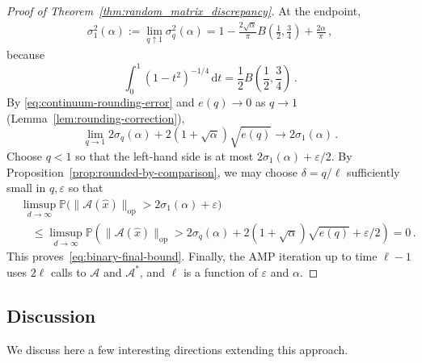 \documentclass[11pt]{article}
\theoremstyle{definition}
\theoremstyle{remark}
\numberwithin{equation}{section}
\numberwithin{theorem}{section}
\newcommand{\Prob}{\mathbb P}
\newcommand{\op}{\mathrm{op}}
\newcommand{\cA}{\mathcal A}
\newcommand{\eps}{\varepsilon}
\newcommand{\rmd}{\mathrm{d}}
\begin{document}
\begin{proof}[Proof of Theorem~\ref{thm:random_matrix_discrepancy}]
At the endpoint,
\begin{align}
 \sigma_1^2(\alpha)
 :=
 \lim_{q\uparrow1}\sigma_q^2(\alpha)
 =
 1-\frac{2\sqrt\alpha}{\pi}
 B\left(\frac12,\frac34\right)
 +\frac{2\alpha}{\pi}\,,
 \label{eq:sigma-one-endpoint-rounding}
\end{align}
because
\[
 \int_0^1(1-t^2)^{-1/4}\,\rmd t
 =
 \frac{1}{2} B\left(\frac12,\frac34\right)\,.
\]
%
By \eqref{eq:continuum-rounding-error} and $e(q) \to 0$ as $q \to 1$ (Lemma~\ref{lem:rounding-correction}),
\[
\lim_{q \to 1} 2\sigma_q(\alpha)+2(1+\sqrt\alpha)\sqrt{e(q)}
 \longrightarrow2\sigma_1(\alpha)\,.
\]
Choose $q<1$ so that the left-hand side is at most $2\sigma_1(\alpha)+\varepsilon/2$. By Proposition~\ref{prop:rounded-by-comparison}, we may choose $\delta = q/\ell$ sufficiently small in $q, \eps$ so that 
\begin{align*}
&\limsup_{d\to\infty} \Prob\Big(
 \|\cA(\widehat x)\|_{\op}
 >
 2\sigma_1(\alpha)+\eps \Big) \\
 &\quad \le \limsup_{d\to\infty} \Prob\left(
 \|\cA(\widehat x)\|_{\op}
 >
 2\sigma_q(\alpha)
 +2(1+\sqrt\alpha)\sqrt{e(q)}
 +\eps/2
 \right) = 0 \,.
\end{align*} 
This proves~\eqref{eq:binary-final-bound}. Finally, the AMP iteration up to time $\ell-1$ uses $2\ell$ calls to $\cA$ and $\cA^*$, and $\ell$ is a function of $\eps$ and $\alpha$.
\end{proof}



\subsection{Discussion}

We discuss here a few interesting directions extending this approach. 
\end{document}
